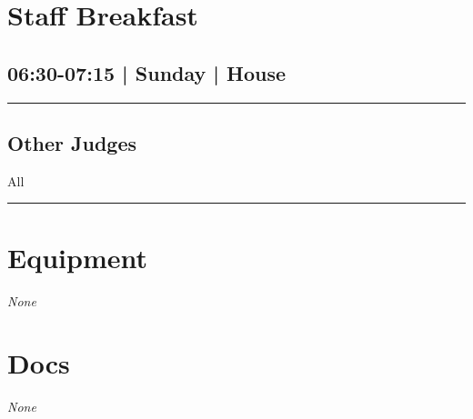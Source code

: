 \documentclass[10pt, A5]{article}
\begin{document}
        \begin{framed}
        \begin{minipage}{\textwidth}

        \setcounter{section}{55}
        \section{Staff Breakfast}
        \subsection*{06:30-07:15 | Sunday | House}

        \vspace{0.25cm}
        \hrule
        \vspace{0.25cm}


        \subsection*{Other Judges}
                    All

            \vspace{0.25cm}
        \hrule
        \vspace{0.25cm}

        \begin{multicols}{2}

		\section*{\faWrench \: Equipment}

				\textit{None}
		
		\vfill\null
		\columnbreak

			\section*{\faFile \: Docs}
		 	\textit{None}
	

		\vfill\null

		\end{multicols}
\end{minipage}
\end{framed}
\end{document}
